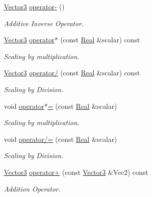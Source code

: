 \begin{DoxyCompactItemize}
\hyperlink{classphys_1_1Vector3}{Vector3} \hyperlink{classphys_1_1Vector3_afb86ac7edd78353ec3d11d9f2efdf0cb}{operator-\/} ()
\begin{DoxyCompactList}\small\item\em Additive Inverse Operator. \item\end{DoxyCompactList}\item 
\hyperlink{classphys_1_1Vector3}{Vector3} \hyperlink{classphys_1_1Vector3_ab9b40eb9eb73d806434550604e048faa}{operator$\ast$} (const \hyperlink{namespacephys_af7eb897198d265b8e868f45240230d5f}{Real} \&scalar) const 
\begin{DoxyCompactList}\small\item\em Scaling by multiplication. \item\end{DoxyCompactList}\item 
\hyperlink{classphys_1_1Vector3}{Vector3} \hyperlink{classphys_1_1Vector3_a4bb5377ad78c299b40a8bc9fb66a902f}{operator/} (const \hyperlink{namespacephys_af7eb897198d265b8e868f45240230d5f}{Real} \&scalar) const 
\begin{DoxyCompactList}\small\item\em Scaling by Division. \item\end{DoxyCompactList}\item 
void \hyperlink{classphys_1_1Vector3_ae04a2cdca40ac24180d6fb62babb34d7}{operator$\ast$=} (const \hyperlink{namespacephys_af7eb897198d265b8e868f45240230d5f}{Real} \&scalar)
\begin{DoxyCompactList}\small\item\em Scaling by multiplication. \item\end{DoxyCompactList}\item 
void \hyperlink{classphys_1_1Vector3_ae16bc8ff2f9897b52c36655a8ba8a1be}{operator/=} (const \hyperlink{namespacephys_af7eb897198d265b8e868f45240230d5f}{Real} \&scalar)
\begin{DoxyCompactList}\small\item\em Scaling by Division. \item\end{DoxyCompactList}\item 
\hyperlink{classphys_1_1Vector3}{Vector3} \hyperlink{classphys_1_1Vector3_ab9799d4796f3750d44f591986d78e436}{operator+} (const \hyperlink{classphys_1_1Vector3}{Vector3} \&Vec2) const 
\begin{DoxyCompactList}\small\item\em Addition Operator. \item\end{DoxyCompactList}\item 

\end{DoxyCompactItemize}

